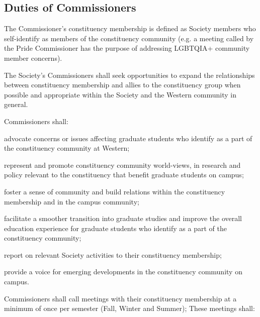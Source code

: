 \subsection{Duties of Commissioners}
\begin{longenum}[ label*=\thesubsection.\arabic*., align=left]
\item The Commissioner's constituency membership is defined as Society members who self-identify as members of the constituency community (e.g. a meeting called by the Pride Commissioner has the purpose of addressing LGBTQIA+ community member concerns).

\item The Society's Commissioners shall seek opportunities to expand the relationships between constituency membership and allies to the constituency group when possible and appropriate within the Society and the Western community in general.
\item Commissioners shall:
\begin{longenum}[ label*=\arabic*., align=left]
\item  advocate concerns or issues affecting graduate students who identify as a part of the constituency community at Western;
\item  represent and promote constituency community world-views, in research and policy relevant to the constituency that benefit graduate students on campus;
\item  foster a sense of community and build relations within the constituency membership and in the campus community;
\item  facilitate a smoother transition into graduate studies and improve the overall education experience for graduate students who identify as a part of the constituency community;
\item report on relevant Society activities to their constituency membership;
\item  provide a voice for emerging developments in the constituency community on campus.
\end{longenum}
\item Commissioners shall call meetings with their constituency membership at a minimum of once per semester (Fall, Winter and Summer);\newline
These meetings shall:
\begin{longenum}[ label*=\arabic*., align=left]



\end{longenum}
\end{longenum}
